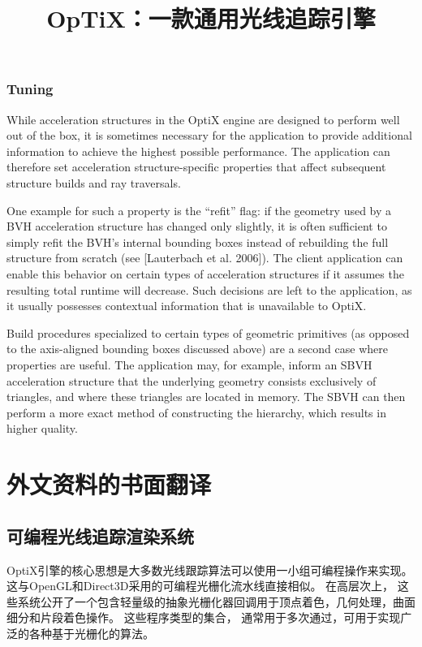 \subsection{Tuning}

While acceleration structures in the OptiX engine are designed to
perform well out of the box, it is sometimes necessary for the application to provide additional information to achieve the highest
possible performance. The application can therefore set acceleration structure-specific properties that affect subsequent structure
builds and ray traversals.

One example for such a property is the “refit” flag: if the geometry
used by a BVH acceleration structure has changed only slightly, it is
often sufficient to simply refit the BVH’s internal bounding boxes
instead of rebuilding the full structure from scratch (see [Lauterbach et al. 2006]). The client application can enable this behavior
on certain types of acceleration structures if it assumes the resulting
total runtime will decrease. Such decisions are left to the application, as it usually possesses contextual information that is unavailable to OptiX.

Build procedures specialized to certain types of geometric primitives (as opposed to the axis-aligned bounding boxes discussed
above) are a second case where properties are useful. The application may, for example, inform an SBVH acceleration structure
that the underlying geometry consists exclusively of triangles, and
where these triangles are located in memory. The SBVH can then
perform a more exact method of constructing the hierarchy, which
results in higher quality.

\chapter{外文资料的书面翻译}

\title{OpTiX：一款通用光线追踪引擎}

\section{可编程光线追踪渲染系统}

OptiX引擎的核心思想是大多数光线跟踪算法可以使用一小组可编程操作来实现。 
这与OpenGL和Direct3D采用的可编程光栅化流水线直接相似。 在高层次上，
这些系统公开了一个包含轻量级的抽象光栅化器回调用于顶点着色，几何处理，曲面细分和片段着色操作。 这些程序类型的集合，
通常用于多次通过，可用于实现广泛的各种基于光栅化的算法。

